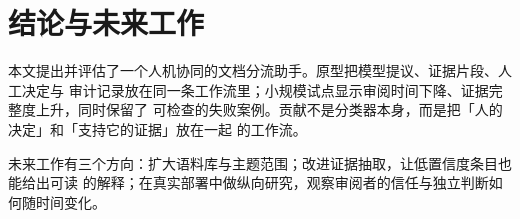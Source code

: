 \section{结论与未来工作}
\label{sec:conclusion}

本文提出并评估了一个人机协同的文档分流助手。原型把模型提议、证据片段、人工决定与
审计记录放在同一条工作流里；小规模试点显示审阅时间下降、证据完整度上升，同时保留了
可检查的失败案例。贡献不是分类器本身，而是把「人的决定」和「支持它的证据」放在一起
的工作流。

未来工作有三个方向：扩大语料库与主题范围；改进证据抽取，让低置信度条目也能给出可读
的解释；在真实部署中做纵向研究，观察审阅者的信任与独立判断如何随时间变化。

